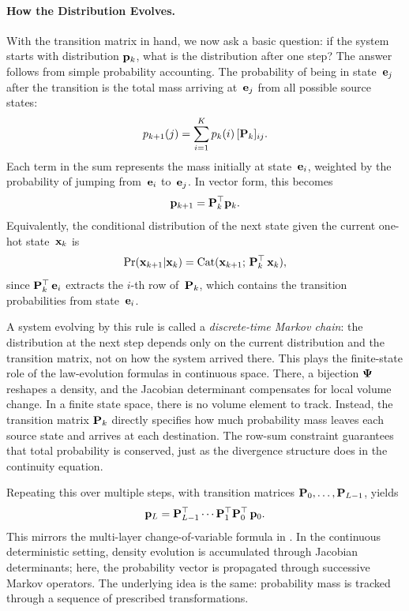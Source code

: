 \paragraph{How the Distribution Evolves.}
With the transition matrix in hand, we now ask a basic question: if the
system starts with distribution ${\mathbf{p}}_k$, what is the distribution after
one step? The answer follows from simple probability accounting. The
probability of being in state~${\mathbf{e}}_j$ after the transition is the total
mass arriving at~${\mathbf{e}}_j$ from all possible source states:
\begin{equation}
p_{k+1}(j) = \sum_{i=1}^K p_k(i)\,[{\mathbf{P}}_k]_{ij}.
\label{eq:discrete-transport-one-step}
\end{equation}
Each term in the sum represents the mass initially at state~${\mathbf{e}}_i$,
weighted by the probability of jumping from~${\mathbf{e}}_i$ to~${\mathbf{e}}_j$.
In vector form, this becomes
\[
{\mathbf{p}}_{k+1} = {\mathbf{P}}_k^\top {\mathbf{p}}_k.
\]
Equivalently, the conditional distribution of the next state given the
current one-hot state~${\mathbf{x}}_k$ is
\[
\Pr({\mathbf{x}}_{k+1} | {\mathbf{x}}_k)
= \mathrm{Cat}({\mathbf{x}}_{k+1};\,{\mathbf{P}}_k^\top\,{\mathbf{x}}_k),
\]
since ${\mathbf{P}}_k^\top\,{\mathbf{e}}_i$ extracts the $i$-th row of~${\mathbf{P}}_k$, which
contains the transition probabilities from state~${\mathbf{e}}_i$.

A system evolving by this rule is called a \emph{discrete-time Markov
chain}: the distribution at the next step depends only on the current
distribution and the transition matrix, not on how the system arrived
there. This plays the finite-state role of the law-evolution formulas in continuous space. There, a bijection ${\bm{\Psi}}$ reshapes a density, and the
Jacobian determinant compensates for local volume change. In a finite
state space, there is no volume element to track. Instead, the transition
matrix ${\mathbf{P}}_k$ directly specifies how much probability mass leaves each
source state and arrives at each destination. The row-sum constraint
guarantees that total probability is conserved, just as the divergence
structure does in the continuity equation.

Repeating this over multiple steps, with transition matrices
${\mathbf{P}}_0, \dots, {\mathbf{P}}_{L-1}$, yields
\begin{equation*}
{\mathbf{p}}_L = {\mathbf{P}}_{L-1}^\top \cdots {\mathbf{P}}_1^\top {\mathbf{P}}_0^\top\, {\mathbf{p}}_0.
\end{equation*}
This mirrors the multi-layer change-of-variable formula in
. In the continuous deterministic setting, density
evolution is accumulated through Jacobian determinants; here, the
probability vector is propagated through successive Markov operators.
The underlying idea is the same: probability mass is tracked through a
sequence of prescribed transformations.

